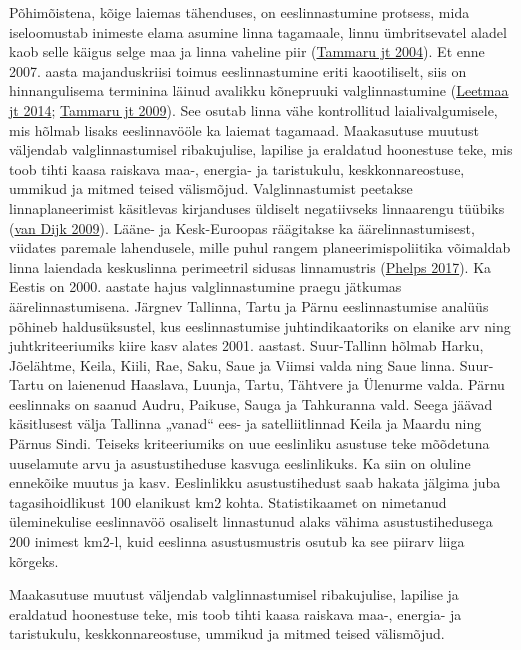 \documentclass[estonian,]{article}
\begin{document}
Põhimõistena, kõige laiemas tähenduses, on eeslinnastumine protsess, mida iseloomustab inimeste elama asumine linna tagamaale, linnu ümbritsevatel aladel kaob selle käigus selge maa ja linna vaheline piir (\protect\hyperlink{Tammaru2004}{Tammaru jt 2004}). Et enne 2007. aasta majanduskriisi toimus eeslinnastumine eriti kaootiliselt, siis on hinnangulisema terminina läinud avalikku kõnepruuki valglinnastumine (\protect\hyperlink{Leetmaa2014}{Leetmaa jt 2014}; \protect\hyperlink{Tammaru2009}{Tammaru jt 2009}). See osutab linna vähe kontrollitud laialivalgumisele, mis hõlmab lisaks eeslinnavööle ka laiemat tagamaad. Maakasutuse muutust väljendab valglinnastumisel ribakujulise, lapilise ja eraldatud hoonestuse teke, mis toob tihti kaasa raiskava maa-, energia- ja taristukulu, keskkonnareostuse, ummikud ja mitmed teised välismõjud. Valglinnastumist peetakse linnaplaneerimist käsitlevas kirjanduses üldiselt negatiivseks linnaarengu tüübiks (\protect\hyperlink{van-Dijk2009}{van Dijk 2009}). Lääne- ja Kesk-Euroopas räägitakse ka äärelinnastumisest, viidates paremale lahendusele, mille puhul rangem planeerimispoliitika võimaldab linna laiendada keskuslinna perimeetril sidusas linnamustris (\protect\hyperlink{Phelps2017}{Phelps 2017}). Ka Eestis on 2000. aastate hajus valglinnastumine praegu jätkumas äärelinnastumisena.
Järgnev Tallinna, Tartu ja Pärnu eeslinnastumise analüüs põhineb haldusüksustel, kus eeslinnastumise juhtindikaatoriks on elanike arv ning juhtkriteeriumiks kiire kasv alates 2001. aastast. Suur-Tallinn hõlmab Harku, Jõelähtme, Keila, Kiili, Rae, Saku, Saue ja Viimsi valda ning Saue linna. Suur-Tartu on laienenud Haaslava, Luunja, Tartu, Tähtvere ja Ülenurme valda. Pärnu eeslinnaks on saanud Audru, Paikuse, Sauga ja Tahkuranna vald. Seega jäävad käsitlusest välja Tallinna „vanad`` ees- ja satelliitlinnad Keila ja Maardu ning Pärnus Sindi. Teiseks kriteeriumiks on uue eeslinliku asustuse teke mõõdetuna uuselamute arvu ja asustustiheduse kasvuga eeslinlikuks. Ka siin on oluline ennekõike muutus ja kasv. Eeslinlikku asustustihedust saab hakata jälgima juba tagasihoidlikust 100 elanikust km2 kohta. Statistikaamet on nimetanud üleminekulise eeslinnavöö osaliselt linnastunud alaks vähima asustustihedusega 200 inimest km2-l, kuid eeslinna asustusmustris osutub ka see piirarv liiga kõrgeks.

\begin{blockquote-right}
Maakasutuse muutust väljendab valglinnastumisel ribakujulise, lapilise
ja eraldatud hoonestuse teke, mis toob tihti kaasa raiskava maa-,
energia- ja taristukulu, keskkonnareostuse, ummikud ja mitmed teised
välismõjud.
\end{blockquote-right}
\end{document}
